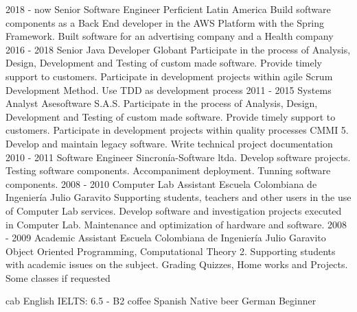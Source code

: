 \documentclass[icon]{twentysecondcv}
\begin{document}
\begin{twenty}
\twentyitem
    {2018 - now}
    {Senior Software Engineer}
    {Perficient Latin America}
    {Build software components as a Back End developer in the AWS Platform with the Spring Framework. Built software for an advertising company and a Health company}
\twentyitem
    {2016 - 2018}
    {Senior Java Developer}
    {Globant}
    {Participate in the process of Analysis, Design, Development and Testing of custom made software. Provide timely support to customers. Participate in development projects within agile Scrum Development Method. Use TDD as development process}
  \twentyitem
    {2011 - 2015}
    {Systems Analyst}
    {Asesoftware S.A.S.}
    {Participate in the process of Analysis, Design, Development and Testing of custom made software. Provide timely support to customers. Participate in development projects within quality processes CMMI 5. Develop and maintain legacy software. Write technical project documentation}
  \twentyitem
    {2010 - 2011}
    {Software Engineer}
    {Sincron\'ia-Software ltda.}
    {Develop software projects. Testing software components. Accompaniment deployment. Tunning software components.}
\twentyitem
    {2008 - 2010}
    {Computer Lab Assistant}
    {Escuela Colombiana de Ingenier\'ia  Julio Garavito}
    {Supporting students, teachers and other users in the use of Computer Lab services. Develop software and investigation projects executed in Computer Lab. Maintenance and optimization of hardware and software.}
\twentyitem
    {2008 - 2009}
    {Academic Assistant}
    {Escuela Colombiana de Ingenier\'ia  Julio Garavito}
    {Object Oriented Programming, Computational Theory 2. Supporting students with academic issues on the subject. Grading Quizzes, Home works and Projects. Some classes if requested}

\end{twenty}


\begin{twentyshorticon}
  \twentyitemshorticon
    {cab}
    {English}
    {IELTS: 6.5 - B2}
  \twentyitemshorticon
    {coffee}
    {Spanish}
    {Native}
  \twentyitemshorticon
    {beer}
    {German}
    {Beginner}
\end{twentyshorticon}


\end{document}
